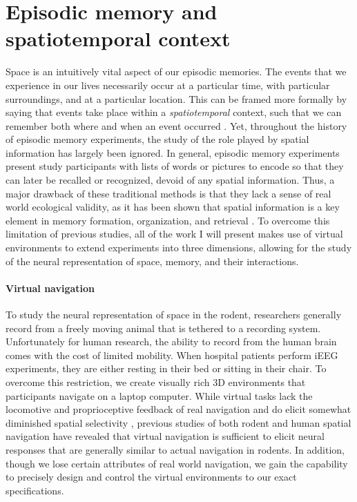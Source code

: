


\section{Episodic memory and spatiotemporal context}

Space is an intuitively vital aspect of our episodic memories. The events that we experience in our lives necessarily occur at a particular time, with particular surroundings, and at a particular location. This can be framed more formally by saying that events take place within a \textit{spatiotemporal} context, such that we can remember both where and when an event occurred \citep{Tulv83,Eich04}. Yet, throughout the history of episodic memory experiments, the study of the role played by spatial information has largely been ignored. In general, episodic memory experiments present study participants with lists of words or pictures to encode so that they can later be recalled or recognized, devoid of any spatial information. Thus, a major drawback of these traditional methods is that they lack a sense of real world ecological validity, as it has been shown that spatial information is a key element in memory formation, organization, and retrieval \citep{MillEtal12a}. To overcome this limitation of previous studies, all of the work I will present makes use of virtual environments to extend experiments into three dimensions, allowing for the study of the neural representation of space, memory, and their interactions.

\paragraph{Virtual navigation} 

To study the neural representation of space in the rodent, researchers generally record from a freely moving animal that is tethered to a recording system. Unfortunately for human research, the ability to record from the human brain comes with the cost of limited mobility. When hospital patients perform iEEG experiments, they are either resting in their bed or sitting in their chair. To overcome this restriction, we create visually rich 3D environments that participants navigate on a laptop computer. While virtual tasks lack the locomotive and proprioceptive feedback of real navigation and do elicit somewhat diminished spatial selectivity \citep{ChenEtal13,RavaEtal13}, previous studies of both rodent \citep{HarvEtal09,ChenEtal13} and human \citep{EkstEtal03,JacoEtal10,JacoEtal13} spatial navigation have revealed that virtual navigation is sufficient to elicit neural responses that are generally similar to actual navigation in rodents. In addition, though we lose certain attributes of real world navigation, we gain the capability to precisely design and control the virtual environments to our exact specifications.

